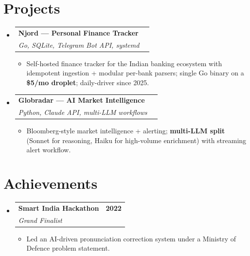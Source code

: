 \documentclass[letterpaper,11pt]{article}
\makeatletter
\newcommand{\resumeItem}[1]{\item\small{#1\vspace{-2pt}}}
\newcommand{\resumeSubheading}[4]{
  \item
  \begin{tabular*}{1.0\textwidth}{l@{\extracolsep{\fill}}r}
    \textbf{#1} & \textbf{\small #2} \\
    \textit{\small #3} & \textit{\small #4} \\
  \end{tabular*}\vspace{-6pt}
}
\newcommand{\resumeSubHeadingListStart}{\begin{itemize}[leftmargin=0in,label={}]}
\newcommand{\resumeSubHeadingListEnd}{\end{itemize}}
\newcommand{\resumeItemListStart}{\begin{itemize}}
\newcommand{\resumeItemListEnd}{\end{itemize}\vspace{-6pt}}
\makeatother
\begin{document}
\section{Projects}
\resumeSubHeadingListStart

\resumeSubheading
{Njord --- Personal Finance Tracker}{}
{Go, SQLite, Telegram Bot API, systemd}{}
\resumeItemListStart
\resumeItem{Self-hosted finance tracker for the Indian banking ecosystem with idempotent ingestion + modular per-bank parsers; single Go binary on a \textbf{\$5/mo droplet}; daily-driver since 2025.}
\resumeItemListEnd

\resumeSubheading
{Globradar --- AI Market Intelligence}{}
{Python, Claude API, multi-LLM workflows}{}
\resumeItemListStart
\resumeItem{Bloomberg-style market intelligence + alerting; \textbf{multi-LLM split} (Sonnet for reasoning, Haiku for high-volume enrichment) with streaming alert workflow.}
\resumeItemListEnd

\resumeSubHeadingListEnd

\section{Achievements}
\resumeSubHeadingListStart
\resumeSubheading
{Smart India Hackathon}{2022}
{Grand Finalist}{}
\resumeItemListStart
\resumeItem{Led an AI-driven pronunciation correction system under a Ministry of Defence problem statement.}
\resumeItemListEnd
\resumeSubHeadingListEnd
\end{document}
